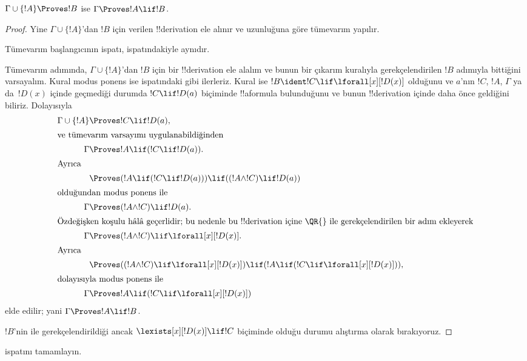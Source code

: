 \documentclass[../../../include/open-logic-section]{subfiles}
\begin{document}


\begin{thm}
 $\Gamma \cup \{!A\} \Proves !B$ ise
$\Gamma \Proves !A \lif !B$.
\end{thm}

\begin{proof}
Yine $\Gamma \cup \{!A\}$'dan $!B$ için verilen !!{derivation} ele alınır ve
uzunluğuna göre tümevarım yapılır.

Tümevarım başlangıcının ispatı,  ispatındakiyle
aynıdır.

Tümevarım adımında, $\Gamma \cup \{!A\}$'dan $!B$ için bir !!{derivation}
ele alalım ve bunun bir çıkarım kuralıyla gerekçelendirilen $!B$ adımıyla
bittiğini varsayalım. Kural
modus ponens ise  ispatındaki gibi ilerleriz.
Kural \QR{} ise $!B \ident !C \lif \lforall[x][!D(x)]$ olduğunu ve
$a$'nın $!C$, $!A$, $\Gamma$ ya da~$!D(x)$ içinde geçmediği durumda
$!C \lif !D(a)$ biçiminde !!a{formula} bulunduğunu ve bunun !!{derivation}
içinde daha önce geldiğini biliriz. Dolayısıyla
\begin{align*}
  \Gamma \cup \{!A\} & \Proves !C \lif !D(a),\\
  \intertext{ve tümevarım varsayımı uygulanabildiğinden}
    \Gamma & \Proves !A \lif (!C \lif !D(a)).\\
  \intertext{Ayrıca}
  & \Proves (!A \lif (!C \lif !D(a))) \lif ((!A \land !C) \lif !D(a))\\
  \intertext{olduğundan modus ponens ile}
  \Gamma & \Proves (!A \land !C) \lif !D(a).\\
  \intertext{Özdeğişken koşulu hâlâ geçerlidir; bu nedenle bu !!{derivation} içine \QR{} ile gerekçelendirilen bir adım ekleyerek}
    \Gamma & \Proves (!A \land !C) \lif \lforall[x][!D(x)].\\
  \intertext{Ayrıca}
    & \Proves ((!A \land !C) \lif \lforall[x][!D(x)]) \lif
    (!A \lif (!C \lif \lforall[x][!D(x)])),\\
  \intertext{dolayısıyla modus ponens ile}
    \Gamma & \Proves !A \lif (!C \lif \lforall[x][!D(x)])
\end{align*}
elde edilir; yani $\Gamma \Proves !A \lif !B$.

$!B$'nin \QR{} ile gerekçelendirildiği ancak
$\lexists[x][!D(x)] \lif !C$ biçiminde olduğu durumu alıştırma olarak
bırakıyoruz.
\end{proof}

\begin{prob}
   ispatını tamamlayın.
\end{prob}
\end{document}
